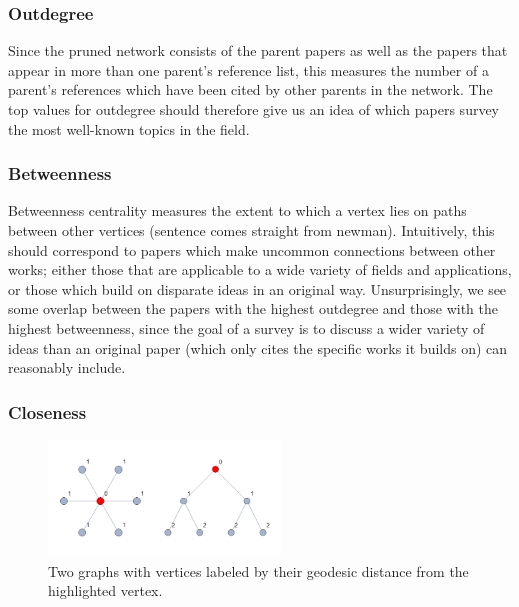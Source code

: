 \documentclass[12pt]{thesis}
\theoremstyle{plain}
\theoremstyle{definition}
\theoremstyle{remark}
\begin{document}
\subsubsection{Outdegree} Since the pruned network consists of the parent papers as well as the papers that appear in more than one parent's reference list, this measures the number of a parent's references which have been cited by other parents in the network. The top values for outdegree should therefore give us an idea of which papers survey the most well-known topics in the field.

\subsubsection{Betweenness} Betweenness centrality measures the extent to which a vertex lies on paths between other vertices (sentence comes straight from newman). Intuitively, this should correspond to papers which make uncommon connections between other works; either those that are applicable to a wide variety of fields and applications, or those which build on disparate ideas in an original way. Unsurprisingly, we see some overlap between the papers with the highest outdegree and those with the highest betweenness, since the goal of a survey is to discuss a wider variety of ideas than an original paper (which only cites the specific works it builds on) can reasonably include.

\subsubsection{Closeness} 

\begin{figure}
\centering
\vspace{-25pt}
\includegraphics[width=0.55\textwidth]{closeness_demo.png}
\vspace{-10pt}
\caption{Two graphs with vertices labeled by their geodesic distance from the highlighted vertex.}
\vspace{-20pt}
\label{fig:closeness_demo}
\end{figure}
\end{document}
